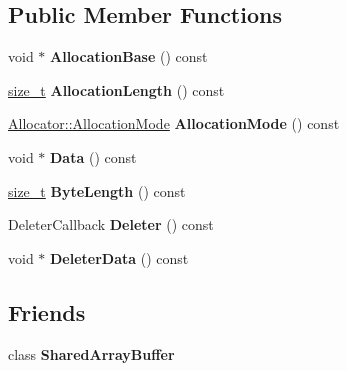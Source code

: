 \subsection*{Public Member Functions}
\begin{DoxyCompactItemize}
\item 
\mbox{\label{classv8_1_1SharedArrayBuffer_1_1Contents_a0a17b70f92830caf87f23cd3dc276489}} 
void $\ast$ {\bfseries Allocation\+Base} () const
\item 
\mbox{\label{classv8_1_1SharedArrayBuffer_1_1Contents_a5d3facf7b33602f5bd8d6641c15a626a}} 
\mbox{\hyperlink{classsize__t}{size\+\_\+t}} {\bfseries Allocation\+Length} () const
\item 
\mbox{\label{classv8_1_1SharedArrayBuffer_1_1Contents_ae0ad06b6417e2e66cc903f230dffbfe5}} 
\mbox{\hyperlink{classv8_1_1ArrayBuffer_1_1Allocator_ab106d1fbad7be9f6fd8b0f5c550ac59e}{Allocator\+::\+Allocation\+Mode}} {\bfseries Allocation\+Mode} () const
\item 
\mbox{\label{classv8_1_1SharedArrayBuffer_1_1Contents_a8a795e7b725530f608c83528e5d4193b}} 
void $\ast$ {\bfseries Data} () const
\item 
\mbox{\label{classv8_1_1SharedArrayBuffer_1_1Contents_a3678ae4afdb9884a5beeab644966382b}} 
\mbox{\hyperlink{classsize__t}{size\+\_\+t}} {\bfseries Byte\+Length} () const
\item 
\mbox{\label{classv8_1_1SharedArrayBuffer_1_1Contents_aa53c887a604cb1fc79e485cb7c765847}} 
Deleter\+Callback {\bfseries Deleter} () const
\item 
\mbox{\label{classv8_1_1SharedArrayBuffer_1_1Contents_ac3d565b291b4090206db8f2ab80876c5}} 
void $\ast$ {\bfseries Deleter\+Data} () const
\end{DoxyCompactItemize}
\subsection*{Friends}
\begin{DoxyCompactItemize}
\item 
\mbox{\label{classv8_1_1SharedArrayBuffer_1_1Contents_a35ac2a80dda42f728b7b1dfc4c3cc040}} 
class {\bfseries Shared\+Array\+Buffer}
\end{DoxyCompactItemize}


